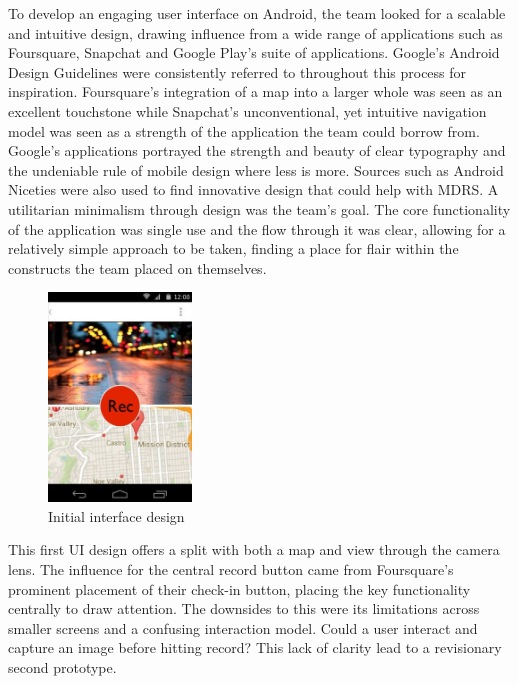 \documentclass{l3proj}
\begin{document}
To develop an engaging user interface on Android, the team looked for a scalable and intuitive design, drawing influence from a wide range of applications such as Foursquare, Snapchat and Google Play’s suite of applications. Google's Android Design Guidelines were consistently referred to throughout this process for inspiration.  Foursquare's integration of a map into a larger whole was seen as an excellent touchstone while Snapchat's unconventional, yet intuitive navigation model was seen as a strength of the application the team could borrow from. Google's applications portrayed the strength and beauty of clear typography and the undeniable rule of mobile design where less is more. Sources such as Android Niceties were also used to find innovative design that could help with MDRS. A utilitarian minimalism through design was the team's goal. The core functionality of the application was single use and the flow through it was clear, allowing for a relatively simple approach to be taken, finding a place for flair within the constructs the team placed on themselves.

\begin{figure}
\begin{center}
  \includegraphics[width=0.34\textwidth]{images/android-digital-prototype-1.jpg}
\end{center}
\caption{Initial interface design}
\end{figure}

This first UI design offers a split with both a map and view through the camera
lens. The influence for the central record button came from Foursquare’s
prominent placement of their check-in button, placing the key functionality
centrally to draw attention. The downsides to this were its limitations across
smaller screens and a confusing interaction model. Could a user interact and
capture an image before hitting record? This lack of clarity lead to a
revisionary second prototype.
\end{document}
